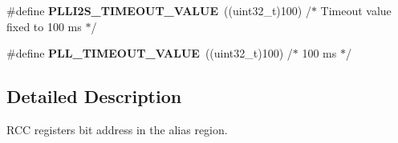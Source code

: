 \begin{DoxyCompactItemize}
\item 
\#define {\bfseries P\+L\+L\+I2\+S\+\_\+\+T\+I\+M\+E\+O\+U\+T\+\_\+\+V\+A\+L\+UE}~((uint32\+\_\+t)100)  /$\ast$ Timeout value fixed to 100 ms  $\ast$/\hypertarget{group___r_c_c_ex___bit_address___alias_region_ga50ad77d63441cb945dd630964285cc07}{}\label{group___r_c_c_ex___bit_address___alias_region_ga50ad77d63441cb945dd630964285cc07}

\item 
\#define {\bfseries P\+L\+L\+\_\+\+T\+I\+M\+E\+O\+U\+T\+\_\+\+V\+A\+L\+UE}~((uint32\+\_\+t)100)  /$\ast$ 100 ms $\ast$/\hypertarget{group___r_c_c_ex___bit_address___alias_region_gad54d8ad9b3511329efee38b3ad0665de}{}\label{group___r_c_c_ex___bit_address___alias_region_gad54d8ad9b3511329efee38b3ad0665de}

\end{DoxyCompactItemize}


\subsection{Detailed Description}
R\+CC registers bit address in the alias region. 

